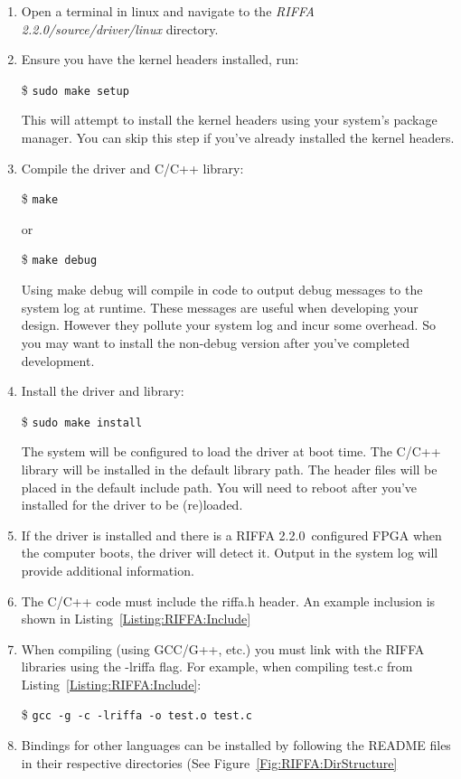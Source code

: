 \documentclass{refrep}
\newcommand{\RIFFAVer}{2.2.0}
\newcommand{\Directory}[1]{\textit{#1}}
\newcommand{\TermCmd}[1]{\$ \texttt{#1}}
\begin{document}
\begin{enumerate}
\item Open a terminal in linux and navigate to the \Directory{RIFFA \RIFFAVer/source/driver/linux} directory.
\item Ensure you have the kernel headers installed, run:

  \TermCmd{sudo make setup}

  This will attempt to install the kernel headers using your system's package
  manager. You can skip this step if you've already installed the kernel headers.
\item Compile the driver and C/C++ library:

  \TermCmd{make}

  or

  \TermCmd{make debug}

  Using make debug will compile in code to output debug messages to the system log
  at runtime. These messages are useful when developing your design. However they
  pollute your system log and incur some overhead. So you may want to install the
  non-debug version after you've completed development.
\item Install the driver and library:

  \TermCmd{sudo make install}

  The system will be configured to load the driver at boot time. The C/C++ library
  will be installed in the default library path. The header files will be placed
  in the default include path. You will need to reboot after you've installed for
  the driver to be (re)loaded. 
\item If the driver is installed and there is a RIFFA \RIFFAVer~configured FPGA when the computer boots, the
  driver will detect it. Output in the system log will provide additional
  information. 
\item The C/C++ code must include the riffa.h header. An example inclusion is
  shown in Listing~\ref{Listing:RIFFA:Include}
\item When compiling (using GCC/G++, etc.) you must link with the RIFFA
  libraries using the -lriffa flag. For example, when compiling test.c from
  Listing~\ref{Listing:RIFFA:Include}:

  \TermCmd{gcc -g -c -lriffa -o test.o test.c}
\item Bindings for other languages can be installed by following the README
  files in their respective directories (See Figure~\ref{Fig:RIFFA:DirStructure}
\end{enumerate}
\end{document}
